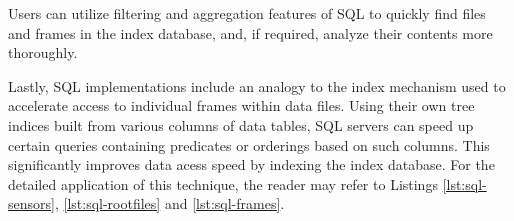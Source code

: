 Users can utilize filtering and aggregation features of SQL to quickly find files and frames in the index database, and, if required, analyze their contents more thoroughly.

Lastly, SQL implementations include an analogy to the index mechanism used to accelerate access to individual frames within data files. Using their own tree indices built from various columns of data tables, SQL servers can speed up certain queries containing predicates or orderings based on such columns. This significantly improves data acess speed by indexing the index database. For the detailed application of this technique, the reader may refer to Listings \ref{lst:sql-sensors}, \ref{lst:sql-rootfiles} and \ref{lst:sql-frames}.


